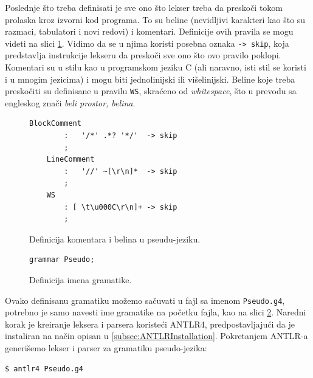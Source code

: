 Poslednje što treba definisati je sve ono što lekser treba da preskoči tokom prolaska kroz izvorni kod programa. To su beline (nevidljivi karakteri kao što su razmaci, tabulatori i novi redovi) i komentari. Definicije ovih pravila se mogu videti na slici \ref{fig:PseudoDef7}. Vidimo da se u njima koristi posebna oznaka \texttt{-> skip}, koja predstavlja instrukcije lekseru da preskoči sve ono što ovo pravilo poklopi. Komentari su u stilu kao u programskom jeziku C (ali naravno, isti stil se koristi i u mnogim jezicima) i mogu biti jednolinijski ili višelinijski. Beline koje treba preskočiti su definisane u pravilu \texttt{WS}, skraćeno od \emph{whitespace}, što u prevodu sa engleskog znači \emph{beli prostor, belina}.

\begin{figure}[h!]
    \begin{lstlisting}[language={}]
    BlockComment
        :   '/*' .*? '*/'  -> skip
        ;
    LineComment
        :   '//' ~[\r\n]*  -> skip
        ;
    WS  
        : [ \t\u000C\r\n]+ -> skip
        ;
    \end{lstlisting}
    \caption{Definicija komentara i belina u pseudu-jeziku.}
    \label{fig:PseudoDef7}
\end{figure}

\begin{figure}[h!]
    \begin{lstlisting}[language={}]
    grammar Pseudo;
    \end{lstlisting}
    \caption{Definicija imena gramatike.}
    \label{fig:PseudoDef8}
\end{figure}

Ovako definisanu gramatiku možemo sačuvati u fajl sa imenom \texttt{Pseudo.g4}, potrebno je samo navesti ime gramatike na početku fajla, kao na slici \ref{fig:PseudoDef8}. Naredni korak je kreiranje leksera i parsera koristeći ANTLR4, predpostavljajući da je instaliran na način opisan u \ref{subsec:ANTLRInstallation}. Pokretanjem ANTLR-a generišemo lekser i parser za gramatiku pseudo-jezika:
\begin{lstlisting}[language={}]
$ antlr4 Pseudo.g4
\end{lstlisting}

